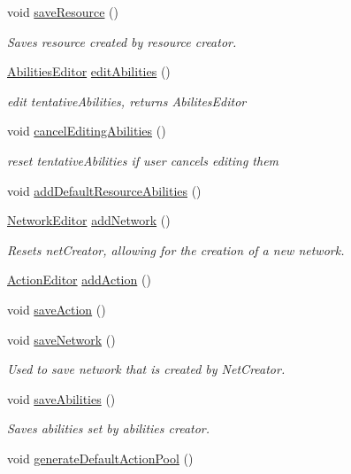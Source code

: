 \begin{DoxyCompactItemize}
void \mbox{\hyperlink{class_creature_editor_af35082ae3f97f9385b6d27efb1528e7c}{save\+Resource}} ()
\begin{DoxyCompactList}\small\item\em Saves resource created by resource creator. \end{DoxyCompactList}\item 
\mbox{\hyperlink{class_abilities_editor}{Abilities\+Editor}} \mbox{\hyperlink{class_creature_editor_a60b1083bafbb24636e356f2ca79e91b7}{edit\+Abilities}} ()
\begin{DoxyCompactList}\small\item\em edit tentative\+Abilities, returns Abilites\+Editor \end{DoxyCompactList}\item 
void \mbox{\hyperlink{class_creature_editor_afc80714657aedc32aaaa54760bc6b78f}{cancel\+Editing\+Abilities}} ()
\begin{DoxyCompactList}\small\item\em reset tentative\+Abilities if user cancels editing them \end{DoxyCompactList}\item 
void \mbox{\hyperlink{class_creature_editor_a73b06f4546ad17a435f487a3a515e661}{add\+Default\+Resource\+Abilities}} ()
\item 
\mbox{\hyperlink{class_network_editor}{Network\+Editor}} \mbox{\hyperlink{class_creature_editor_a2c3d33249073a6af3cd536cc02832635}{add\+Network}} ()
\begin{DoxyCompactList}\small\item\em Resets net\+Creator, allowing for the creation of a new network. \end{DoxyCompactList}\item 
\mbox{\hyperlink{class_action_editor}{Action\+Editor}} \mbox{\hyperlink{class_creature_editor_a558b61296fbae7699cfafdcc02bd8858}{add\+Action}} ()
\item 
void \mbox{\hyperlink{class_creature_editor_a4f9898932327b32b8eaedd8667acff18}{save\+Action}} ()
\item 
void \mbox{\hyperlink{class_creature_editor_a30e7e56df84510ae8487df6b62dc7f2a}{save\+Network}} ()
\begin{DoxyCompactList}\small\item\em Used to save network that is created by Net\+Creator. \end{DoxyCompactList}\item 
void \mbox{\hyperlink{class_creature_editor_a986bfbfe3b55a2b6492e1b4b371cf592}{save\+Abilities}} ()
\begin{DoxyCompactList}\small\item\em Saves abilities set by abilities creator. \end{DoxyCompactList}\item 
void \mbox{\hyperlink{class_creature_editor_a1d2e73a7a581c8e1e6c25c46ad8c8ace}{generate\+Default\+Action\+Pool}} ()
\end{DoxyCompactItemize}
